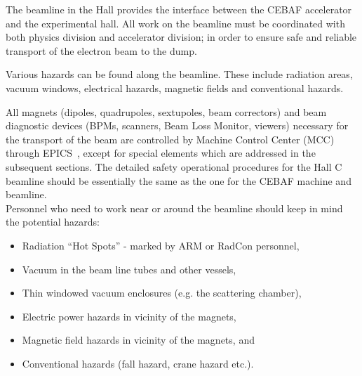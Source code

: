 \begin{safetyen}{0}{0}
%
%

The beamline in the Hall provides the interface between the CEBAF
accelerator and the experimental hall.  All work on the beamline must
be coordinated with both physics division and accelerator division; in
order to ensure safe and reliable transport of the electron beam to
the dump.


Various hazards can be found along the beamline.  These include
radiation areas, vacuum windows, electrical hazards, magnetic fields
and conventional hazards.


All magnets (dipoles, quadrupoles, sextupoles, beam correctors) and
beam diagnostic devices (BPMs, scanners, Beam Loss Monitor, viewers)
necessary for the transport of the beam are controlled by Machine
Control Center (MCC) through EPICS~\cite{EPICSwww}, except for special
elements which are addressed in the subsequent sections. The detailed
safety operational procedures for the Hall C beamline should be
essentially the same as the one for the CEBAF machine and beamline.\\

\noindent{}Personnel who need to work near or around the beamline should keep in mind the potential hazards:
\begin{itemize}
  \item Radiation ``Hot Spots'' - marked by ARM or RadCon
  personnel, \item Vacuum in the beam line tubes and other
  vessels, \item Thin windowed vacuum enclosures (e.g. the scattering
  chamber), \item Electric power hazards in vicinity of the
  magnets, \item Magnetic field hazards in vicinity of the magnets,
  and \item Conventional hazards (fall hazard, crane hazard etc.).
\end{itemize}


\end{safetyen}
